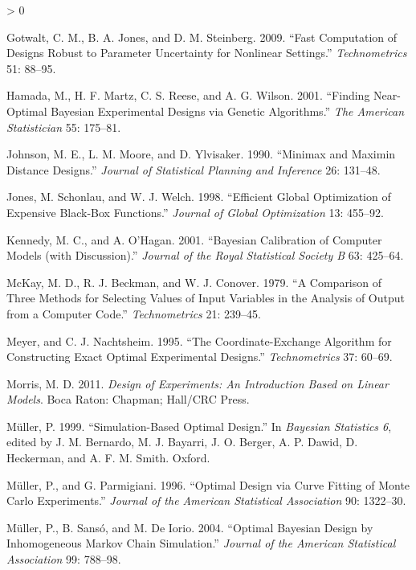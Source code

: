\documentclass[
  ignorenonframetext,
]{beamer}
\newlength{\cslhangindent}
\newenvironment{CSLReferences}[2] %
 {%
  \setlength{\parindent}{0pt}
  \ifodd #1 \everypar{\setlength{\hangindent}{\cslhangindent}}\ignorespaces\fi
  \ifnum #2 > 0
  \setlength{\parskip}{#2\baselineskip}
  \fi
 }%
 {}
\begin{document}
\begin{frame}{}
\begin{CSLReferences}{1}{0}
\leavevmode\hypertarget{ref-GJS2009}{}%
Gotwalt, C. M., B. A. Jones, and D. M. Steinberg. 2009. {``Fast
Computation of Designs Robust to Parameter Uncertainty for Nonlinear
Settings.''} \emph{Technometrics} 51: 88--95.

\leavevmode\hypertarget{ref-HMRW2001}{}%
Hamada, M., H. F. Martz, C. S. Reese, and A. G. Wilson. 2001. {``Finding
Near-Optimal {B}ayesian Experimental Designs via Genetic Algorithms.''}
\emph{The American Statistician} 55: 175--81.

\leavevmode\hypertarget{ref-JMY1990}{}%
Johnson, M. E., L. M. Moore, and D. Ylvisaker. 1990. {``Minimax and
Maximin Distance Designs.''} \emph{Journal of Statistical Planning and
Inference} 26: 131--48.

\leavevmode\hypertarget{ref-JSW1998}{}%
Jones, M. Schonlau, and W. J. Welch. 1998. {``Efficient Global
Optimization of Expensive Black-Box Functions.''} \emph{Journal of
Global Optimization} 13: 455--92.

\leavevmode\hypertarget{ref-KOH2001}{}%
Kennedy, M. C., and A. O'Hagan. 2001. {``Bayesian Calibration of
Computer Models (with Discussion).''} \emph{Journal of the Royal
Statistical Society B} 63: 425--64.

\leavevmode\hypertarget{ref-MBC1979}{}%
McKay, M. D., R. J. Beckman, and W. J. Conover. 1979. {``A Comparison of
Three Methods for Selecting Values of Input Variables in the Analysis of
Output from a Computer Code.''} \emph{Technometrics} 21: 239--45.

\leavevmode\hypertarget{ref-MN1995}{}%
Meyer, and C. J. Nachtsheim. 1995. {``The Coordinate-Exchange Algorithm
for Constructing Exact Optimal Experimental Designs.''}
\emph{Technometrics} 37: 60--69.

\leavevmode\hypertarget{ref-Morris2011}{}%
Morris, M. D. 2011. \emph{Design of Experiments: An Introduction Based
on Linear Models}. Boca Raton: Chapman; Hall/CRC Press.

\leavevmode\hypertarget{ref-Muller1999}{}%
Müller, P. 1999. {``Simulation-Based Optimal Design.''} In
\emph{Bayesian Statistics 6}, edited by J. M. Bernardo, M. J. Bayarri,
J. O. Berger, A. P. Dawid, D. Heckerman, and A. F. M. Smith. Oxford.

\leavevmode\hypertarget{ref-MP1996}{}%
Müller, P., and G. Parmigiani. 1996. {``Optimal Design via Curve Fitting
of {Monte Carlo} Experiments.''} \emph{Journal of the American
Statistical Association} 90: 1322--30.

\leavevmode\hypertarget{ref-MSD2004}{}%
Müller, P., B. Sansó, and M. De Iorio. 2004. {``Optimal Bayesian Design
by Inhomogeneous Markov Chain Simulation.''} \emph{Journal of the
American Statistical Association} 99: 788--98.


\end{CSLReferences}
\end{frame}
\end{document}
